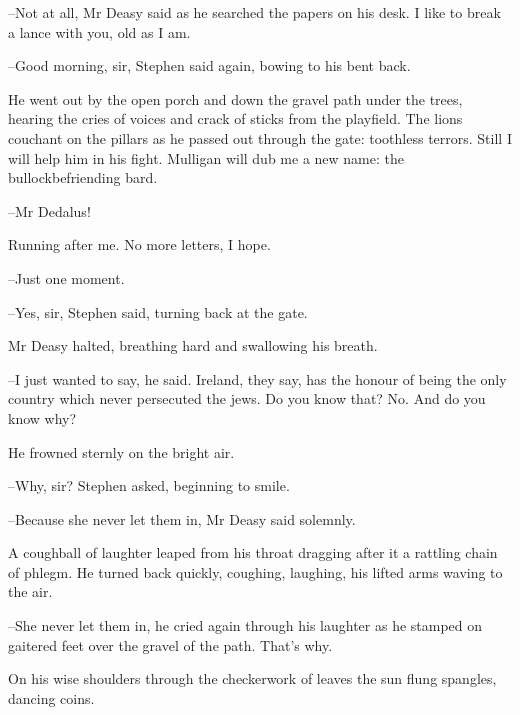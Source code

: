 --Not at all, Mr Deasy said as he searched the papers on his desk. I like
to break a lance with you, old as I am.

--Good morning, sir, Stephen said again, bowing to his bent back.

He went out by the open porch and down the gravel path under the
trees, hearing the cries of voices and crack of sticks from the playfield.
The lions couchant on the pillars as he passed out through the gate:
toothless terrors. Still I will help him in his fight. Mulligan will dub
me a new name: the bullockbefriending bard.

--Mr Dedalus!

Running after me. No more letters, I hope.

--Just one moment.

--Yes, sir, Stephen said, turning back at the gate.

Mr Deasy halted, breathing hard and swallowing his breath.

--I just wanted to say, he said. Ireland, they say, has the honour of
being the only country which never persecuted the jews. Do you know that?
No. And do you know why?

He frowned sternly on the bright air.

--Why, sir? Stephen asked, beginning to smile.

--Because she never let them in, Mr Deasy said solemnly.

A coughball of laughter leaped from his throat dragging after it a
rattling chain of phlegm. He turned back quickly, coughing, laughing, his
lifted arms waving to the air.

--She never let them in, he cried again through his laughter as he
stamped on gaitered feet over the gravel of the path. That's why.

On his wise shoulders through the checkerwork of leaves the sun flung
spangles, dancing coins.



